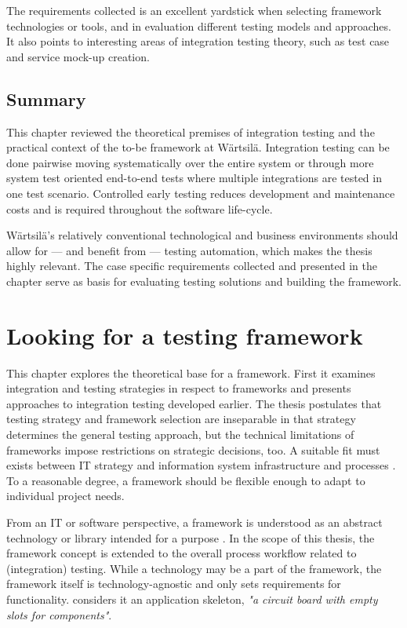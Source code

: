 \documentclass[12pt,a4paper,oneside,pdftex]{report}
\begin{document}
The requirements collected is an excellent yardstick when selecting framework technologies or tools, and in evaluation different testing models and approaches. It also points to interesting areas of integration testing theory, such as test case and service mock-up creation.

\section{Summary}

This chapter reviewed the theoretical premises of integration testing and the practical context of the to-be framework at Wärtsilä. Integration testing can be done pairwise moving systematically over the entire system or through more system test oriented end-to-end tests where multiple integrations are tested in one test scenario. Controlled early testing reduces development and maintenance costs and is required throughout the software life-cycle.

Wärtsilä's relatively conventional technological and business environments should allow for --- and benefit from --- testing automation, which makes the thesis highly relevant. The case specific requirements collected and presented in the chapter serve as basis for evaluating testing solutions and building the framework.

\chapter{Looking for a testing framework}
\label{chapter:frameworktheory}

This chapter explores the theoretical base for a framework. First it examines integration and testing strategies in respect to frameworks and presents approaches to integration testing developed earlier. The thesis postulates that testing strategy and framework selection are inseparable in that strategy determines the general testing approach, but the technical limitations of frameworks impose restrictions on strategic decisions, too. A suitable fit must exists between IT strategy and information system infrastructure and processes \citep{henderson1993strategic}. To a reasonable degree, a framework should be flexible enough to adapt to individual project needs.


From an IT or software perspective, a framework is understood as an abstract technology or library intended for a purpose \citep{johnson1988designing}. In the scope of this thesis, the framework concept is extended to the overall process workflow related to (integration) testing. While a technology may be a part of the framework, the framework itself is technology-agnostic and only sets requirements for functionality. \citet{pezze2008software} considers it an application skeleton, \textit{"a circuit board with empty slots for components"}. 
\end{document}
